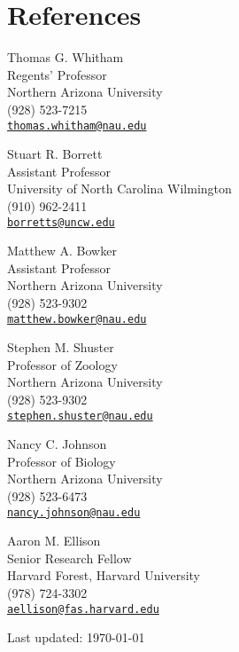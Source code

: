 \documentclass[letterpaper]{article}
\renewenvironment{itemize}{
  \begin{list}{}{
    \setlength{\leftmargin}{1em}
  }
}{
  \end{list}
}
\begin{document}
\section{References}

\begin{minipage}[t]{0.5\textwidth}
\begin{itemize}
\item Thomas G. Whitham \\ Regents' Professor \\ Northern Arizona University \\
  (928) 523-7215 \\
  \href{mailto:thomas.whitham@nau.edu}{\texttt {thomas.whitham@nau.edu}}
\item Stuart R. Borrett \\ Assistant Professor \\ University of North
  Carolina Wilmington\\
  (910) 962-2411 \\
  \href{mailto:borretts@uncw.edu}{\tt borretts@uncw.edu}
\item Matthew A. Bowker \\ Assistant Professor \\ Northern Arizona University \\
  (928) 523-9302 \\
  \href{mailto:matthew.bowker@nau.edu}{\tt matthew.bowker@nau.edu}

\end{itemize}
\end{minipage}
\begin{minipage}[t]{0.5\textwidth}
\begin{itemize}
\item Stephen M. Shuster \\ Professor of Zoology \\ Northern Arizona University \\
  (928) 523-9302 \\
  \href{mailto:stephen.shuster@nau.edu}{\tt stephen.shuster@nau.edu}
\item Nancy C. Johnson \\ Professor of Biology \\ Northern Arizona University \\
  (928) 523-6473 \\
  \href{mailto:nancy.johnson@nau.edu}{\tt nancy.johnson@nau.edu}
\item Aaron M. Ellison \\ Senior Research Fellow \\ Harvard Forest, Harvard University \\
  (978) 724-3302 \\
  \href{mailto:aellison@fas.harvard.edu}{\tt aellison@fas.harvard.edu}
\end{itemize}
\end{minipage}


\bigskip

\begin{center}
\begin{footnotesize}
Last updated: \today \\
\end{footnotesize}
\end{center}
\end{document}

